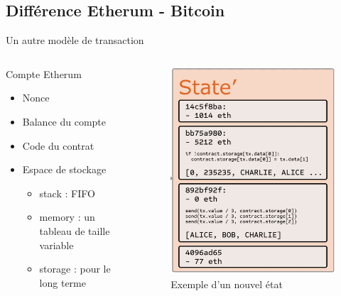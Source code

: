 \documentclass[presentation]{beamer}
\begin{document}
\subsection{Différence Etherum - Bitcoin}
\label{sec:org2fcc8fd}
\begin{frame}[label={sec:orge74439f}]{Un autre modèle de transaction}
\begin{columns}
\begin{column}{0.5\columnwidth}
\begin{block}{}
\begin{block}{Compte Etherum}
\begin{itemize}
\item Nonce
\item Balance du compte
\item Code du contrat
\item <2> Espace de stockage
\begin{itemize}
\item stack : FIFO
\item memory : un tableau de taille variable
\item storage : pour le long terme
\end{itemize}
\end{itemize}
\end{block}
\end{block}
\end{column}

\begin{column}{0.5\columnwidth}
\begin{block}{}
\begin{figure}[htbp]
\centering
\includegraphics[width=.6\textwidth]{Images/etat_etherum.png}
\caption{Exemple d'un nouvel état}
\end{figure}
\end{block}
\end{column}
\end{columns}
\end{frame}
\end{document}
